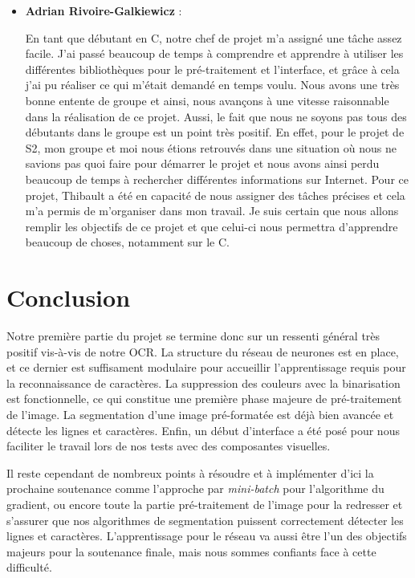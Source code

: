 \begin{itemize}
    \item \textbf{Adrian Rivoire-Galkiewicz} :

        En tant que débutant en C, notre chef de projet m’a assigné une tâche
        assez facile. J’ai passé beaucoup de temps à comprendre et apprendre à
        utiliser les différentes bibliothèques pour le pré-traitement et
        l’interface, et grâce à cela j’ai pu réaliser ce qui m’était demandé en
        temps voulu. Nous avons une très bonne entente de groupe et ainsi, nous
        avançons à une vitesse raisonnable dans la réalisation de ce projet.
        Aussi, le fait que nous ne soyons pas tous des débutants dans le groupe
        est un point très positif. En effet, pour le projet de S2, mon groupe et
        moi nous étions retrouvés dans une situation où nous ne savions pas quoi
        faire pour démarrer le projet et nous avons ainsi perdu beaucoup de
        temps à rechercher différentes informations sur Internet. Pour ce
        projet, Thibault a été en capacité de nous assigner des tâches précises
        et cela m’a permis de m’organiser dans mon travail. Je suis certain que
        nous allons remplir les objectifs de ce projet et que celui-ci nous
        permettra d’apprendre beaucoup de choses, notamment sur le C.

\end{itemize}

\chapter{Conclusion}

Notre première partie du projet se termine donc sur un ressenti général très
positif vis-à-vis de notre OCR. La structure du réseau de neurones est en place,
et ce dernier est suffisament modulaire pour accueillir l'apprentissage requis
pour la reconnaissance de caractères. La suppression des couleurs avec la
binarisation est fonctionnelle, ce qui constitue une première phase majeure de
pré-traitement de l'image. La segmentation d'une image pré-formatée est déjà
bien avancée et détecte les lignes et caractères. Enfin, un début d'interface a
été posé pour nous faciliter le travail lors de nos tests avec des composantes
visuelles.

Il reste cependant de nombreux points à résoudre et à implémenter d'ici la
prochaine soutenance comme l'approche par \textit{mini-batch} pour l'algorithme
du gradient, ou encore toute la partie pré-traitement de l'image pour la
redresser et s'assurer que nos algorithmes de segmentation puissent correctement
détecter les lignes et caractères. L'apprentissage pour le réseau va aussi être
l'un des objectifs majeurs pour la soutenance finale, mais nous sommes confiants
face à cette difficulté.

